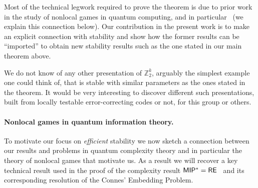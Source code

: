 \documentclass[11pt]{article}
\theoremstyle{definition}
\newcommand{\Z}{\ensuremath{\mathbb{Z}}}
\begin{document}
Most of the technical legwork required to prove the theorem is due to prior work in the study of nonlocal games in quantum computing, and in particular~\cite{ji2020quantum} (we explain this connection below). Our contribution in the present work is to make an explicit connection with stability and show how the former results can be ``imported'' to obtain new stability results such as the one stated in our main theorem above. 

We do not know of any other presentation of $\Z_2^k$, arguably the simplest example one could think of, that is stable with similar parameters as the ones stated in the theorem. It would be very interesting to discover different such presentations, built from locally testable error-correcting codes or not, for this group or others. 

\paragraph{Nonlocal games in quantum information theory.}
To motivate our focus on \emph{efficient} stability we now sketch a connection between our results and problems in quantum complexity theory and in particular the theory of nonlocal games that motivate us. As a result we will recover a key technical result used in the proof of the complexity result $\sf MIP^* = \sf RE$~\cite{ji2020mip} and its corresponding resolution of the Connes' Embedding Problem.
\end{document}
